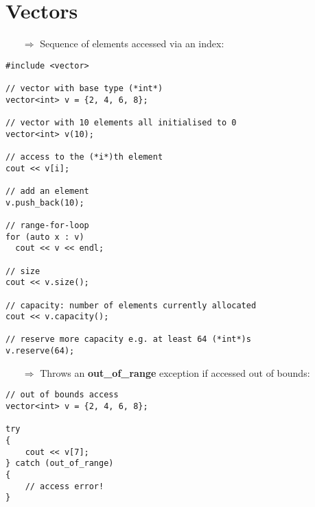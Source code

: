 \documentclass[10pt]{article}
\begin{document}
\section{Vectors}
\small
\begin{enumerate}
\item[$\Rightarrow$] Sequence of elements accessed via an index:
\end{enumerate}
\begin{lstlisting}
#include <vector>

// vector with base type (*int*)
vector<int> v = {2, 4, 6, 8};

// vector with 10 elements all initialised to 0
vector<int> v(10);

// access to the (*i*)th element
cout << v[i];

// add an element
v.push_back(10);

// range-for-loop
for (auto x : v)
  cout << v << endl;

// size
cout << v.size();

// capacity: number of elements currently allocated
cout << v.capacity();

// reserve more capacity e.g. at least 64 (*int*)s
v.reserve(64);
\end{lstlisting}
\begin{enumerate}
\item[$\Rightarrow$] Throws an \textbf{out\_of\_range} exception if accessed out of bounds:
\end{enumerate}
\begin{lstlisting}
// out of bounds access
vector<int> v = {2, 4, 6, 8};

try
{
    cout << v[7];
} catch (out_of_range)
{
    // access error!
}
\end{lstlisting}
%
%
\end{document}
